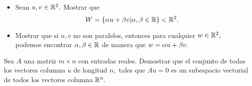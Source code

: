 \begin{resuelto}[\dag]
\begin{itemize}
 \item Sean $u,v \in \mathbb{R}^{2}.$ Mostrar que $$W=\left\{ \alpha u+ \beta v| \alpha, \beta \in \mathbb{R} \right\} < \mathbb{R}^{2}.$$
 \item Mostrar que si $u,v$ no son paralelos, entonces para cualquier $w\in \mathbb{R}^{2},$ podemos encontrar $\alpha,\beta \in
\mathbb{R}$ de manera que $w= \alpha u + \beta v.$
\end{itemize}
\end{resuelto}

\begin{resuelto}[\dag]
 Sea $A$ una matriz $m\times n$ con entradas reales. Demostrar que el conjunto de todas los vectores columna $u$ de
longitud $n,$ tales que $Au=0$ es un subespacio vectorial de todos los vectores columna $\mathbb{R}^{n}.$
\end{resuelto}
